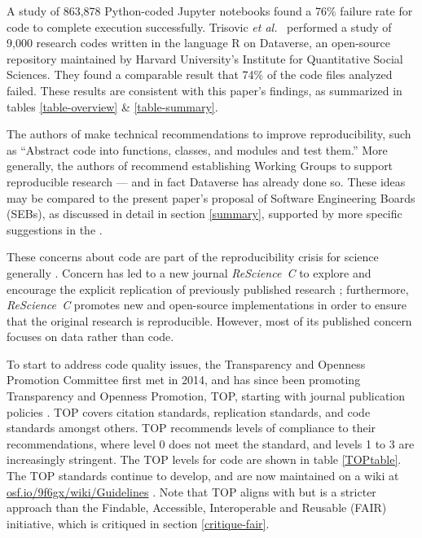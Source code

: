 \documentclass{comjnl}
\begin{document}
A study of 863,878 Python-coded Jupyter notebooks \cite{jupyter-study} found a 76\% failure rate for code to complete execution successfully. Trisovic \emph{et al.}\ \cite{trisovic} performed a  study of 9,000 research codes written in the language R on Dataverse, an open-source repository maintained by Harvard University's Institute for Quantitative Social Sciences. They found a comparable result that 74\% of the code files analyzed failed. These results are consistent with this paper's findings, as summarized in tables \ref{table-overview} \& \ref{table-summary}. 

The authors of \cite{jupyter-study} make technical recommendations to improve reproducibility, such as ``Abstract code into functions, classes, and modules and test them.'' More generally, the authors of \cite{trisovic} recommend establishing Working Groups to support reproducible research --- and in fact Dataverse has already done so. These ideas may be compared to the present paper's proposal of Software Engineering Boards (SEBs), as discussed in detail in section \ref{summary}, supported by more specific suggestions in the \supplement.

These concerns about code are part of the reproducibility crisis for science generally \cite{machine-learning-reproducibility,no-raw-data,data-access,reproducible-manifesto,reproducibility-crisis,reproducible-manifesto}. Concern has led to a new journal \emph{ReScience~C\/} to explore and encourage the explicit replication of previously published research \cite{rescience}; furthermore, \emph{ReScience~C\/} promotes new and open-source implementations in order to ensure that the original research is reproducible. However, most of its published concern focuses on data rather than code. 

To start to address code quality issues, the Transparency and Openness Promotion Committee first met in 2014, and has since been promoting Transparency and Openness Promotion, TOP, starting with journal publication policies \cite{TOP}. TOP covers citation standards, replication standards, and code standards amongst others. TOP recommends levels of compliance to their recommendations, where level 0 does not meet the standard, and levels 1 to 3 are increasingly stringent. The TOP levels for code are shown in table \ref{TOPtable}. The TOP standards  continue to develop, and are now maintained on a wiki at \url{osf.io/9f6gx/wiki/Guidelines} \cite{TOP-wiki}. Note that TOP aligns with but is a stricter approach than the Findable, Accessible, Interoperable and Reusable (FAIR) initiative, which is critiqued in section \ref{critique-fair}.
\end{document}
